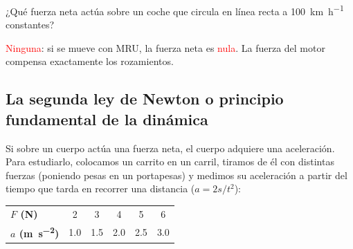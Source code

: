 \begin{exercise}
    ¿Qué fuerza neta actúa sobre un coche que circula en línea recta a \qty{100}{\km\per\hour} constantes?
    \begin{solu}
        \textcolor{red}{Ninguna}: si se mueve con MRU, la fuerza neta es \textcolor{red}{nula}. La fuerza del motor compensa exactamente los rozamientos.
    \end{solu}
\end{exercise}

\subsection{La segunda ley de Newton o principio fundamental de la dinámica}

Si sobre un cuerpo actúa una fuerza neta, el cuerpo adquiere una aceleración. Para estudiarlo, colocamos un carrito en un carril, tiramos de él con distintas fuerzas (poniendo pesas en un portapesas) y medimos su aceleración a partir del tiempo que tarda en recorrer una distancia (\(a = 2s/t^2\)):

\begin{center}
    \begin{tabular}{@{}lccccc@{}}
        \toprule
        \textbf{\(F\) (\unit{\newton})} & 2 & 3 & 4 & 5 & 6 \\[3pt]
        \textbf{\(a\) (\unit{\m\per\square\s})} & \num{1.0} & \num{1.5} & \num{2.0} & \num{2.5} & \num{3.0} \\
        \bottomrule
    \end{tabular}
    \qquad
\end{center}

